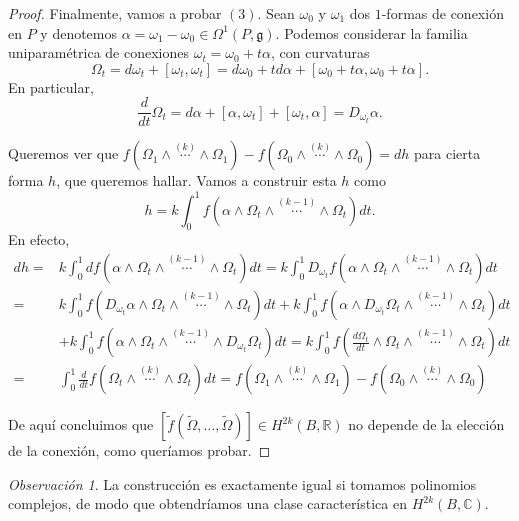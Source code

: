 \documentclass[12pt,a4paper]{article}
\theoremstyle{definition} \newtheorem{defn}[thm]{Definición}
\theoremstyle{definition} \newtheorem{ejemplo}[thm]{Ejemplo}
\theoremstyle{definition} \newtheorem{ejercicio}[thm]{Ejercicio}
\theoremstyle{remark} \newtheorem*{obs}{Observación}
\def\CC{\mathbb{C}}
\def\gg{\mathfrak{g}}
\def\RR{\mathbb{R}}
\begin{document}
\begin{proof}
	  Finalmente, vamos a probar $(3)$. Sean $\omega_0$ y $\omega_1$ dos $1$-formas de conexión en $P$ y denotemos $\alpha=\omega_1-\omega_0 \in \Omega^1(P,\gg)$. Podemos considerar la familia uniparamétrica de conexiones $\omega_t=\omega_0+t\alpha$, con curvaturas
	  \begin{equation*}
	    \Omega_t=d\omega_t + [\omega_t,\omega_t]=d\omega_0 + td\alpha + [\omega_0+t\alpha,\omega_0+t\alpha].
	  \end{equation*}
	  En particular,
	  \begin{equation*}
	    \frac{d}{dt}\Omega_t=d\alpha + [\alpha,\omega_t]+[\omega_t,\alpha]=D_{\omega_t}\alpha.
	  \end{equation*}

Queremos ver que $f(\Omega_1 \wedge \overset{(k)}{\cdots} \wedge \Omega_1)-f(\Omega_0 \wedge \overset{(k)}{\cdots} \wedge \Omega_0)=dh$ para cierta forma $h$, que queremos hallar. Vamos a construir esta $h$ como
\begin{equation*}
  h=k\int_0^1 f(\alpha \wedge \Omega_t \wedge \overset{(k-1)}{\cdots} \wedge \Omega_t) dt.
\end{equation*}
En efecto,
\begin{align*}
  dh =&k\int_{0}^1 df(\alpha\wedge \Omega_t \wedge \overset{(k-1)}{\cdots} \wedge \Omega_t)dt=k\int_{0}^1 D_{\omega_t}f(\alpha\wedge \Omega_t \wedge \overset{(k-1)}{\cdots} \wedge \Omega_t)dt \\
  =& k\int_{0}^1 f(D_{\omega_t}\alpha\wedge \Omega_t \wedge \overset{(k-1)}{\cdots} \wedge \Omega_t)dt+k\int_{0}^1 f(\alpha\wedge D_{\omega_t}\Omega_t \wedge \overset{(k-1)}{\cdots} \wedge \Omega_t)dt\\ &+k\int_{0}^1 f(\alpha\wedge \Omega_t \wedge \overset{(k-1)}{\cdots} \wedge D_{\omega_t}\Omega_t)dt
  = k\int_0^1 f\left( \frac{d\Omega_t}{dt} \wedge \Omega_t \wedge \overset{(k-1)}{\cdots} \wedge \Omega_t \right)dt\\
  =& \int_{0}^1 \frac{d}{dt} f(\Omega_t\wedge \overset{(k)}{\cdots} \wedge \Omega_t)dt = f(\Omega_1\wedge \overset{(k)}{\cdots} \wedge \Omega_1)-f(\Omega_0\wedge \overset{(k)}{\cdots} \wedge \Omega_0)
\end{align*}
  
De aquí concluimos que $[\tilde{f}(\tilde{\Omega},\dots,\tilde{\Omega})]\in H^{2k}(B,\RR)$ no depende de la elección de la conexión, como queríamos probar.
  \end{proof}
	   \begin{obs}
	     La construcción es exactamente igual si tomamos polinomios complejos, de modo que obtendríamos una clase característica en $H^{2k}(B,\CC)$.
	   \end{obs}
\end{document}
